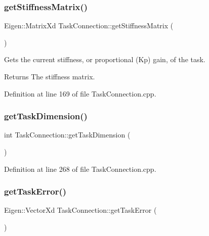 \subsubsection{\texorpdfstring{get\+Stiffness\+Matrix()}{getStiffnessMatrix()}}
{\footnotesize\ttfamily Eigen\+::\+Matrix\+Xd Task\+Connection\+::get\+Stiffness\+Matrix (\begin{DoxyParamCaption}{ }\end{DoxyParamCaption})}

Gets the current stiffness, or proportional (Kp) gain, of the task.

\begin{DoxyReturn}{Returns}
The stiffness matrix. 
\end{DoxyReturn}


Definition at line 169 of file Task\+Connection.\+cpp.

\hypertarget{classocra__recipes_1_1TaskConnection_a14a0075a94a7df0f912b7dbd8f56d8e2}{}\label{classocra__recipes_1_1TaskConnection_a14a0075a94a7df0f912b7dbd8f56d8e2} 
\subsubsection{\texorpdfstring{get\+Task\+Dimension()}{getTaskDimension()}}
{\footnotesize\ttfamily int Task\+Connection\+::get\+Task\+Dimension (\begin{DoxyParamCaption}{ }\end{DoxyParamCaption})}



Definition at line 268 of file Task\+Connection.\+cpp.

\hypertarget{classocra__recipes_1_1TaskConnection_ab968ad0f0a818f240eed58f1780f8586}{}\label{classocra__recipes_1_1TaskConnection_ab968ad0f0a818f240eed58f1780f8586} 
\subsubsection{\texorpdfstring{get\+Task\+Error()}{getTaskError()}}
{\footnotesize\ttfamily Eigen\+::\+Vector\+Xd Task\+Connection\+::get\+Task\+Error (\begin{DoxyParamCaption}{ }\end{DoxyParamCaption})}

